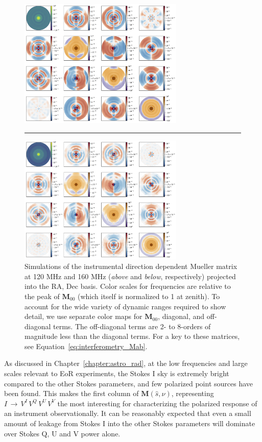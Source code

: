 \begin{figure}
\centering
\includegraphics[width=0.7\textwidth]{chapters/interferometry/figures/full_mueller_120MHz.png}
\par\noindent\rule{0.8\textwidth}{0.4pt}
\includegraphics[width=0.7\textwidth]{chapters/interferometry/figures/full_mueller_160MHz.png}
\caption[Simulations of the instrumental direction-dependent Mueller matrix at 120 MHz and 160 MHz.]{Simulations of the instrumental direction dependent Mueller matrix at 120 MHz and 160 MHz (\textit{above} and \textit{below}, respectively) projected into the RA, Dec basis. Color scales for frequencies are relative to the peak of $\textbf{M}_{00}$ (which itself is normalized to 1 at zenith). To account for the wide variety of dynamic ranges required to show detail, we use separate color maps for $\textbf{M}_{00}$, diagonal, and off-diagonal terms. The off-diagonal terms are 2- to 8-orders of magnitude less than the diagonal terms. For a key to these matrices, see Equation~\ref{eq:interferometry_Mab}.}
\label{fig:interferometry_Mab}
\end{figure}

As discussed in Chapter~\ref{chapter:astro_rad}, at the low frequencies and large scales relevant to EoR experiments, the Stokes I sky is extremely bright compared to the other Stokes parameters, and few polarized point sources have been found. This makes the first column of $\textbf{M}(\hat{s},\nu)$, representing $I\,\rightarrow\,V^I\,V^Q\,V^U\,V^V$ the most interesting for characterizing the polarized response of an instrument observationally. It can be reasonably expected that even a small amount of leakage from Stokes I into the other Stokes parameters will dominate over Stokes Q, U and V power alone.

